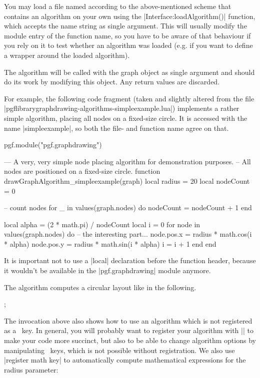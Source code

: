 You may load a file named according to the above-mentioned scheme that
contains an algorithm on your own using the |Interface:loadAlgorithm()|
function, which accepts the name string as single argument. This will
usually modify the module entry of the function name, so you have to
be aware of that behaviour if you rely on it to test whether an
algorithm was loaded (e.g. if you want to define a wrapper around the
loaded algorithm).

The algorithm will be called with the graph object as single argument
and should do its work by modifying this object. Any return
values are discarded.

For example, the following code fragment (taken and slightly altered
from the file |pgflibrarygraphdrawing-algorithms-simpleexample.lua|)
implements a rather simple algorithm, placing all nodes on a fixed-size
circle.  It is accessed with the name |simpleexample|, so both the
file- and function name agree on that.

\begin{codeexample}
pgf.module("pgf.graphdrawing")

--- A very, very simple node placing algorithm for demonstration purposes.
-- All nodes are positioned on a fixed-size circle.
function drawGraphAlgorithm_simpleexample(graph)
   local radius = 20
   local nodeCount = 0

   -- count nodes
   for _ in values(graph.nodes) do
      nodeCount = nodeCount + 1
   end

   local alpha = (2 * math.pi) / nodeCount
   local i = 0
   for node in values(graph.nodes) do
      -- the interesting part...
      node.pos.x = radius * math.cos(i * alpha)
      node.pos.y = radius * math.sin(i * alpha)
      i = i + 1
   end
end
\end{codeexample}

It is important not to use a |local| declaration before the function
header, because it wouldn't be available in the |pgf.graphdrawing|
module anymore.

The algorithm computes a circular layout like in the following.

\begin{codeexample}[]
\tikzpicture [graphs/.cd, graph drawing engine, algorithm=simpleexample]
  ;
\endtikzpicture
\end{codeexample}

The invocation above also shows how to use an algorithm which is not
registered as a \tikzname\ key.  In general, you will probably want to
register your algorithm with |\tikzgraphsset| to make your code more
succinct, but also to be able to change algorithm options by manipulating
\tikzname\ keys, which is not possible without registration.  We also
use |register math key| to automatically compute mathematical
expressions for the radius parameter:


